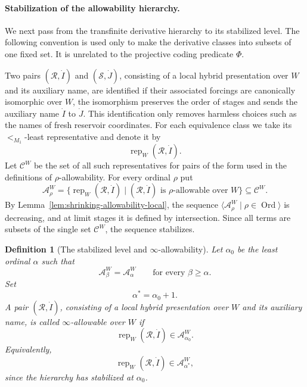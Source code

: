 \documentclass[a4paper,11pt]{article}
\newtheorem{definition}[theorem]{Definition}
\begin{document}
\paragraph{Stabilization of the allowability hierarchy.}
We next pass from the transfinite derivative hierarchy to its stabilized level.
The following convention is used only to make the derivative classes into
subsets of one fixed set.  It is unrelated to the projective coding predicate
\(\Phi\).

Two pairs \((\mathcal R,
\dot I)\) and \((\mathcal S,\dot J)\), consisting of a local
hybrid presentation over \(W\) and its auxiliary name, are identified if their
associated forcings are canonically isomorphic over \(W\), the isomorphism
preserves the order of stages and sends the auxiliary name \(\dot I\) to
\(\dot J\).  This identification only removes harmless choices such as the names
of fresh reservoir coordinates.  For each equivalence class we take its
\(<_{M_1}\)-least representative and denote it by
\[
   \operatorname{rep}_W(\mathcal R,\dot I).
\]
Let \(\mathcal C^W\) be the set of all such representatives for pairs of the
form used in the definitions of \(\rho\)-allowability.  For every ordinal
\(\rho\) put
\[
   \mathcal A^W_\rho
   =
   \{\operatorname{rep}_W(\mathcal R,\dot I)
      \mid (\mathcal R,\dot I)\text{ is }\rho\text{-allowable over }W\}
   \subseteq \mathcal C^W .
\]
By Lemma~\ref{lem:shrinking-allowability-local}, the sequence
\(\langle\mathcal A^W_\rho\mid \rho\in\operatorname{Ord}\rangle\) is decreasing,
and at limit stages it is defined by intersection.  Since all terms are subsets
of the single set \(\mathcal C^W\), the sequence stabilizes.

\begin{definition}[The stabilized level and \(\infty\)-allowability]
\label{def:infty-allowable-local}
Let \(\alpha_0\) be the least ordinal \(\alpha\) such that
\[
   \mathcal A^W_\beta=\mathcal A^W_\alpha
   \qquad\text{for every }\beta\geq\alpha .
\]
Set
\[
   \alpha^\ast=\alpha_0+1 .
\]
A pair \((\mathcal R,\dot I)\), consisting of a local hybrid presentation over
\(W\) and its auxiliary name, is called \emph{\(\infty\)-allowable over \(W\)} if
\[
   \operatorname{rep}_W(\mathcal R,\dot I)
      \in \mathcal A^W_{\alpha_0}.
\]
Equivalently,
\[
   \operatorname{rep}_W(\mathcal R,\dot I)
      \in \mathcal A^W_{\alpha^\ast},
\]
since the hierarchy has stabilized at \(\alpha_0\).
\end{definition}
\end{document}
